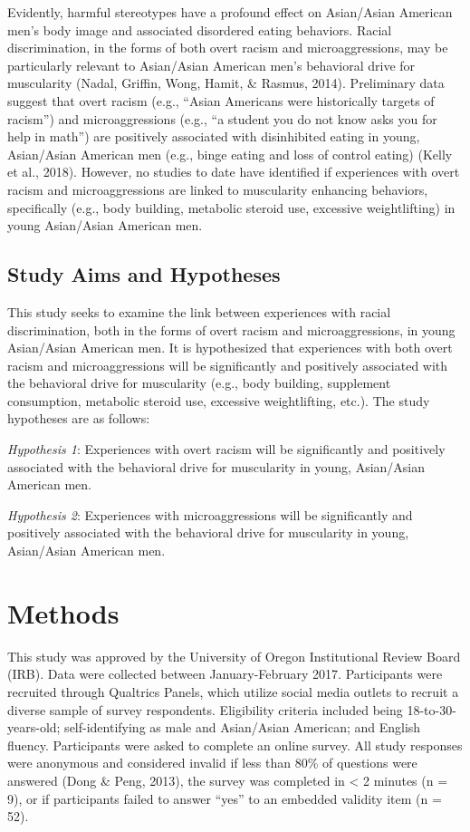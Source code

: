 \documentclass[
  english,
  man, fleqn, noextraspace,floatsintext]{apa6}
\begin{document}
Evidently, harmful stereotypes have a profound effect on Asian/Asian American men's body image and associated disordered eating behaviors. Racial discrimination, in the forms of both overt racism and microaggressions, may be particularly relevant to Asian/Asian American men's behavioral drive for muscularity (Nadal, Griffin, Wong, Hamit, \& Rasmus, 2014). Preliminary data suggest that overt racism (e.g., ``Asian Americans were historically targets of racism'') and microaggressions (e.g., ``a student you do not know asks you for help in math'') are positively associated with disinhibited eating in young, Asian/Asian American men (e.g., binge eating and loss of control eating) (Kelly et al., 2018). However, no studies to date have identified if experiences with overt racism and microaggressions are linked to muscularity enhancing behaviors, specifically (e.g., body building, metabolic steroid use, excessive weightlifting) in young Asian/Asian American men.

\hypertarget{study-aims-and-hypotheses}{%
\subsection{Study Aims and Hypotheses}\label{study-aims-and-hypotheses}}

This study seeks to examine the link between experiences with racial discrimination, both in the forms of overt racism and microaggressions, in young Asian/Asian American men. It is hypothesized that experiences with both overt racism and microaggressions will be significantly and positively associated with the behavioral drive for muscularity (e.g., body building, supplement consumption, metabolic steroid use, excessive weightlifting, etc.). The study hypotheses are as follows:

\emph{Hypothesis 1}: Experiences with overt racism will be significantly and positively associated with the behavioral drive for muscularity in young, Asian/Asian American men.

\emph{Hypothesis 2}: Experiences with microaggressions will be significantly and positively associated with the behavioral drive for muscularity in young, Asian/Asian American men.

\hypertarget{methods}{%
\section{Methods}\label{methods}}

This study was approved by the University of Oregon Institutional Review Board (IRB). Data were collected between January-February 2017. Participants were recruited through Qualtrics Panels, which utilize social media outlets to recruit a diverse sample of survey respondents. Eligibility criteria included being 18-to-30-years-old; self-identifying as male and Asian/Asian American; and English fluency. Participants were asked to complete an online survey. All study responses were anonymous and considered invalid if less than 80\% of questions were answered (Dong \& Peng, 2013), the survey was completed in \textless{} 2 minutes (n = 9), or if participants failed to answer ``yes'' to an embedded validity item (n = 52).
\end{document}
